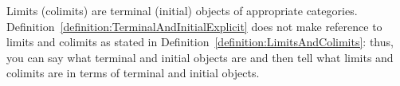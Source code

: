 
Limits (colimits) are terminal (initial) objects of appropriate categories. Definition~\ref{definition:TerminalAndInitialExplicit} does not make reference to limits and colimits as stated in Definition~\ref{definition:LimitsAndColimits}: thus, you can say what terminal and initial objects are and then tell what limits and colimits are in terms of terminal and initial objects.


